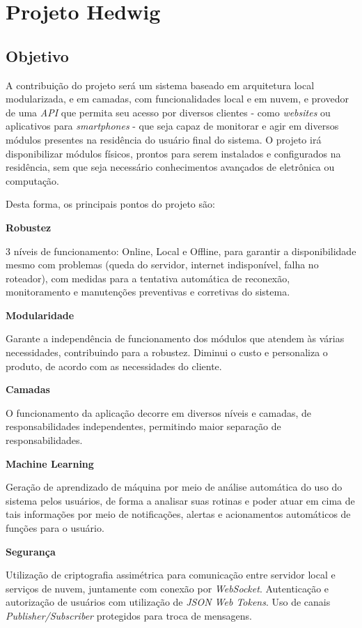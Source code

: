 \section{Projeto Hedwig}

\subsection{Objetivo}
A contribuição do projeto será um sistema baseado em arquitetura local modularizada, e em camadas, com funcionalidades local e em nuvem, e provedor de uma \textit{API} que permita seu acesso por diversos clientes - como \textit{websites} ou aplicativos para \textit{smartphones} - que seja capaz de monitorar e agir em diversos módulos presentes na residência do usuário final do sistema. O projeto irá disponibilizar módulos físicos, prontos para serem instalados e configurados na residência, sem que seja necessário conhecimentos avançados de eletrônica ou computação.

Desta forma, os principais pontos do projeto são:

\begin{description}
\item \textbf{Robustez}

3 níveis de funcionamento: Online, Local e Offline, para garantir a disponibilidade mesmo com problemas (queda do servidor, internet indisponível, falha no roteador), com medidas para a tentativa automática de reconexão, monitoramento e manutenções preventivas e corretivas do sistema.

\item \textbf{Modularidade}

Garante a independência de funcionamento dos módulos que atendem às várias necessidades, contribuindo para a robustez. Diminui o custo e personaliza o produto, de acordo com as necessidades do cliente.

\item \textbf{Camadas}

O funcionamento da aplicação decorre em diversos níveis e camadas, de responsabilidades independentes, permitindo maior separação de responsabilidades.

\item \textbf{Machine Learning}

Geração de aprendizado de máquina por meio de análise automática do uso do sistema pelos usuários, de forma a analisar suas rotinas e poder atuar em cima de tais informações por meio de notificações, alertas e acionamentos automáticos de funções para o usuário.

\item \textbf{Segurança}

Utilização de criptografia assimétrica para comunicação entre servidor local e serviços de nuvem, juntamente com conexão por \textit{WebSocket}. Autenticação e autorização de usuários com utilização de \textit{JSON Web Tokens}. Uso de canais \textit{Publisher/Subscriber} protegidos para troca de mensagens.

\end{description}

